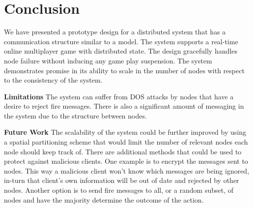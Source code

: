 
\section{Conclusion}
\label{sec:conclusion}

We have presented a prototype design for a distributed \clientServer system that has a communication structure similar to a \ptoP model. The system supports a real-time online multiplayer game with distributed state.
The design gracefully handles node failure without inducing any game play suspension. 
The system demonstrates promise in its ability to scale in the number of nodes with respect to the consistency of the system. 

\noindent \textbf{Limitations}
The system can suffer from DOS attacks by nodes that have a desire to reject fire messages.
There is also a significant amount of messaging in the system due to the \ptoP structure between nodes.

\noindent \textbf{Future Work}
The scalability of the system could be further improved by using a spatial partitioning scheme that would limit the number of relevant nodes each node should keep track of.
There are additional methods that could be used to protect against malicious clients. 
One example is to encrypt the messages sent to nodes. 
This way a malicious client won't know which messages are being ignored, in-turn that client's own information will be out of date and rejected by other nodes.
Another option is to send fire messages to all, or a random subset, of nodes and have the majority determine the outcome of the action.